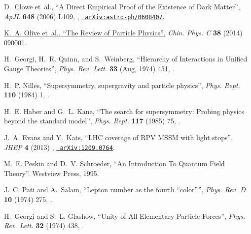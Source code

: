 \documentclass[12pt]{thesis}  %
\begin{document}
\begin{thebibliography}{100}
D.~Clowe\hrefCMSnoop {} { {et~al.}, ``A Direct Empirical Proof of the Existence
  of Dark Matter'',} \textit{ ApJL} \textbf{ 648} (2006) L109,
  \href{http://dx.doi.org/10.1086/508162}{},
  \href{http://www.arXiv.org/abs/astro-ph/0608407}{\texttt{
  arXiv:astro-ph/0608407}}.

\href {http://pdg.lbl.gov} {K.~A. Olive {et~al.}, ``The Review of Particle
  Physics'',} \textit{ Chin. Phys. C} \textbf{ 38} (2014) 090001.

\hrefCMSnoop {} {H.~Georgi, H.~R. Quinn, and S.~Weinberg, ``Hierarchy of
  Interactions in Unified Gauge Theories'',} \textit{ Phys. Rev. Lett.}
  \textbf{ 33} (Aug, 1974) 451,
  \href{http://dx.doi.org/10.1103/PhysRevLett.33.451}{}.

\hrefCMSnoop {} {H.~P. Nilles, ``Supersymmetry, supergravity and particle
  physics'',} \textit{ Phys. Rept.} \textbf{ 110} (1984) 1,
\href{http://dx.doi.org/10.1016/0370-1573(84)90008-5}{}.

\hrefCMSnoop {} {H.~E. Haber and G.~L. Kane, ``The search for supersymmetry:
  Probing physics beyond the standard model'',} \textit{ Phys. Rept.} \textbf{
  117} (1985) 75,
\href{http://dx.doi.org/10.1016/0370-1573(85)90051-1}{}.

\hrefCMSnoop {} {J.~A. Evans and Y.~Kats, ``LHC coverage of RPV MSSM with light
  stops'',} \textit{ JHEP} \textbf{ 4} (2013)
  \href{http://dx.doi.org/10.1007/JHEP04(2013)028}{},
  \href{http://www.arXiv.org/abs/1209.0764}{\texttt{ arXiv:1209.0764}}.

M.~E. Peskin and D.~V. Schroeder, ``{An Introduction To Quantum Field
  Theory}''.
\newblock Westview Press, 1995.

\hrefCMSnoop {} {J.~C. Pati and A.~Salam, ``Lepton number as the fourth
  ``color'''',} \textit{ Phys. Rev. D} \textbf{ 10} (1974) 275,
  \href{http://dx.doi.org/10.1103/PhysRevD.10.275}{}.

\hrefCMSnoop {} {H.~Georgi and S.~L. Glashow, ``Unity of All
  Elementary-Particle Forces'',} \textit{ Phys. Rev. Lett.} \textbf{ 32} (1974)
  438,
  \href{http://dx.doi.org/10.1103/PhysRevLett.32.438}{}.


\end{thebibliography}
\end{document}
